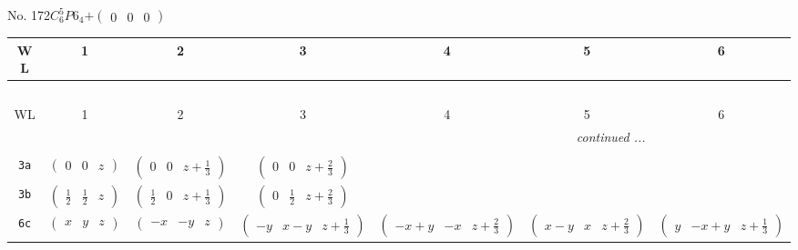 \documentclass[fleqn,9pt,landscape]{jsarticle}
\begin{document}
\newpage
No. 172\quad$C_{6}^{5}$\quad$P6_4$\quad[ hexagonal ]\quad$+\begin{pmatrix} 0 & 0 & 0 \end{pmatrix}$
\begin{center}
\renewcommand{\arraystretch}{1.2}
\begin{longtable}{ccccccc}
 \hline \hline
WL & 1 & 2 & 3 & 4 & 5 & 6 \\ \hline \endfirsthead

\multicolumn{6}{l}{\tablename\ \thetable{}} \\
 \hline \hline
WL & 1 & 2 & 3 & 4 & 5 & 6 \\ \hline \endhead

 \hline \hline
\multicolumn{6}{r}{\footnotesize\it continued ...} \\ \endfoot

 \hline \hline
\multicolumn{6}{r}{} \\ \endlastfoot

{\tt 3a} & $ \begin{pmatrix} 0 & 0 & z \end{pmatrix} $ & $ \begin{pmatrix} 0 & 0 & z + \frac{1}{3} \end{pmatrix} $ & $ \begin{pmatrix} 0 & 0 & z + \frac{2}{3} \end{pmatrix} $ & $  $ & $  $ & $  $ \\ \hline
{\tt 3b} & $ \begin{pmatrix} \frac{1}{2} & \frac{1}{2} & z \end{pmatrix} $ & $ \begin{pmatrix} \frac{1}{2} & 0 & z + \frac{1}{3} \end{pmatrix} $ & $ \begin{pmatrix} 0 & \frac{1}{2} & z + \frac{2}{3} \end{pmatrix} $ & $  $ & $  $ & $  $ \\ \hline
{\tt 6c} & $ \begin{pmatrix} x & y & z \end{pmatrix} $ & $ \begin{pmatrix} - x & - y & z \end{pmatrix} $ & $ \begin{pmatrix} - y & x - y & z + \frac{1}{3} \end{pmatrix} $ & $ \begin{pmatrix} - x + y & - x & z + \frac{2}{3} \end{pmatrix} $ & $ \begin{pmatrix} x - y & x & z + \frac{2}{3} \end{pmatrix} $ & $ \begin{pmatrix} y & - x + y & z + \frac{1}{3} \end{pmatrix} $ \\
\end{longtable}
\end{center}
\end{document}
